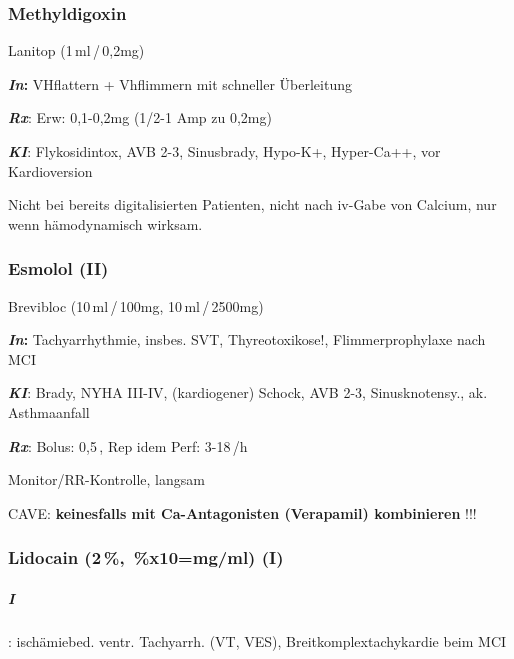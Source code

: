 \subsubsection{Methyldigoxin}

{\color[rgb]{0.5019608,0.5019608,0.5019608}
Lanitop (1\,ml\,/\,0,2mg)}

{\color[rgb]{0.0,0.5019608,0.0}
\textbf{\textit{In}}\textbf{: }VHflattern + Vhflimmern mit schneller
Überleitung}

{\color[rgb]{0.5019608,0.0,0.5019608}
\textbf{\textit{Rx}}: Erw: 0,1-0,2mg (1/2-1 Amp zu 0,2mg)}

{\color[rgb]{0.8627451,0.13725491,0.0}
\textbf{\textit{KI}}: Flykosidintox, AVB 2-3{\textdegree}, Sinusbrady,
Hypo-K+, Hyper-Ca++, vor Kardioversion}

{
Nicht bei bereits digitalisierten Patienten, nicht nach iv-Gabe von
Calcium, nur wenn hämodynamisch wirksam.}



\subsubsection{Esmolol (\textrm{II})}

{\color[rgb]{0.5019608,0.5019608,0.5019608}
Brevibloc (10\,ml\,/\,100mg, 10\,ml\,/\,2500mg)}

{\color[rgb]{0.0,0.5019608,0.0}
\textbf{\textit{In}}\textbf{: }Tachyarrhythmie, insbes. SVT,
Thyreotoxikose!, Flimmerprophylaxe nach MCI}

{\color[rgb]{0.8627451,0.13725491,0.0}
\textbf{\textit{KI}}: Brady, NYHA III-IV, (kardiogener) Schock, AVB
2{\textdegree}-3{\textdegree}, Sinusknotensy., ak. Asthmaanfall}

{\color[rgb]{0.5019608,0.0,0.5019608}
\textbf{\textit{Rx}}: Bolus: 0,5\,, Rep idem\newline
Perf: 3-18\,/h}

{
Monitor/RR-Kontrolle, langsam}

{\color[rgb]{0.5019608,0.0,0.0}
CAVE: \textbf{keinesfalls mit Ca-Antagonisten (Verapamil) kombinieren}
!!!}



\subsubsection{Lidocain (2\,\%, \,\%x10=mg/ml) (\textrm{I})}

\subparagraph{I}: ischämiebed. ventr. Tachyarrh. (VT, VES),
Breitkomplextachykardie beim MCI

